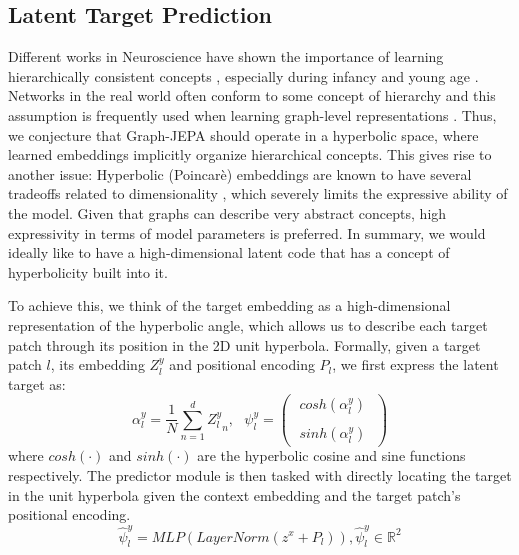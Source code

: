 \documentclass{article} \usepackage{iclr2024_conference,times}
\begin{document}
\subsection{Latent Target Prediction} \label{met:latent_task}
Different works in Neuroscience have shown the importance of learning hierarchically consistent concepts \citep{Deco2021Revisiting}, especially during infancy and young age \citep{Rosenberg2013Infants}. Networks in the real world often conform to some concept of hierarchy \citep{moutsinas2021graph} and this assumption is frequently used when learning graph-level representations \citep{ying2018hierarchical}. Thus, we conjecture that Graph-JEPA should operate in a hyperbolic space, where learned embeddings implicitly organize hierarchical concepts\citep{nickel2017poincare,zhao2023modeling}. This gives rise to another issue: Hyperbolic (Poincarè) embeddings are known to have several tradeoffs related to dimensionality \citep{pmlr-v80-sala18a,guo2022co}, which severely limits the expressive ability of the model. Given that graphs can describe very abstract concepts, high expressivity in terms of model parameters is preferred. In summary, we would ideally like to have a high-dimensional latent code that has a concept of hyperbolicity built into it. 

To achieve this, we think of the target embedding as a high-dimensional representation of the hyperbolic angle, which allows us to describe each target patch through its position in the 2D unit hyperbola. Formally, given a target patch $l$, its embedding $Z^y_l$ and positional encoding $P_l$, we first express the latent target as:
\begin{equation} \label{eq:highdcode}
    \alpha^y_l = \frac{1}{N} \sum_{n=1}^d {Z^y_l}_n, ~~~\psi^y_l = \begin{pmatrix} \; cosh(\alpha^y_l) \; \\ \\ \;  sinh(\alpha^y_l) \; \end{pmatrix} 
\end{equation}
where $cosh(\cdot)$ and $sinh(\cdot)$ are the hyperbolic cosine and sine functions respectively. The predictor module is then tasked with directly locating the target in the unit hyperbola given the context embedding and the target patch's positional encoding. 
\begin{equation} \label{eq:prediction}
    \hat{\psi}^y_l = MLP(LayerNorm(z^x + P_l)), \hat{\psi}^y_l \in \mathbb{R}^2
\end{equation}
\end{document}
